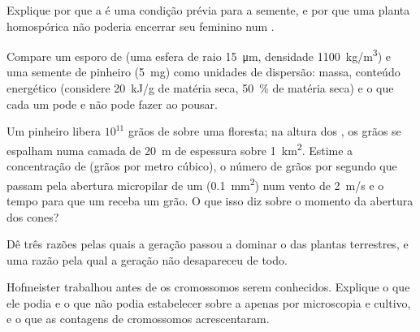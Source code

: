 \begin{exercise}[$\star\star$]\label{exo:b2:plant-life-cycles:8}
Explique por que a  é uma condição prévia para a semente, e
por que uma planta homospórica não poderia encerrar seu 
feminino num .
\end{exercise}

\begin{exercise}[$\star\star$]\label{exo:b2:plant-life-cycles:9}
Compare um esporo de  (uma esfera de raio \qty{15}{\micro m},
densidade \qty{1100}{kg/m^3}) e uma semente de pinheiro (\qty{5}{mg})
como unidades de dispersão: massa, conteúdo energético (considere
\qty{20}{kJ/g} de matéria seca, \qty{50}{\%} de matéria seca) e o que
cada um pode e não pode fazer ao pousar.
\end{exercise}

\begin{exercise}[$\star\star\star$]\label{exo:b2:plant-life-cycles:10}
Um pinheiro libera $10^{11}$ grãos de  sobre uma floresta; na
altura dos , os grãos se espalham numa camada de \qty{20}{m} de
espessura sobre \qty{1}{km^2}. Estime a concentração de  (grãos
por metro cúbico), o número de grãos por segundo que passam pela
abertura micropilar de um  (\qty{0.1}{mm^2}) num vento de
\qty{2}{m/s} e o tempo para que um  receba um grão. O que isso
diz sobre o momento da abertura dos cones?
\end{exercise}

\begin{exercise}[$\star\star\star$]\label{exo:b2:plant-life-cycles:11}
Dê três razões pelas quais a geração  passou a dominar o  das plantas terrestres, e uma razão pela qual a geração
 não desapareceu de todo.
\end{exercise}

\begin{exercise}[$\star\star\star$]\label{exo:b2:plant-life-cycles:12}
Hofmeister trabalhou antes de os cromossomos serem conhecidos. Explique
o que ele podia e o que não podia estabelecer sobre a  apenas por microscopia e cultivo, e o que as contagens de
cromossomos acrescentaram.
\end{exercise}

